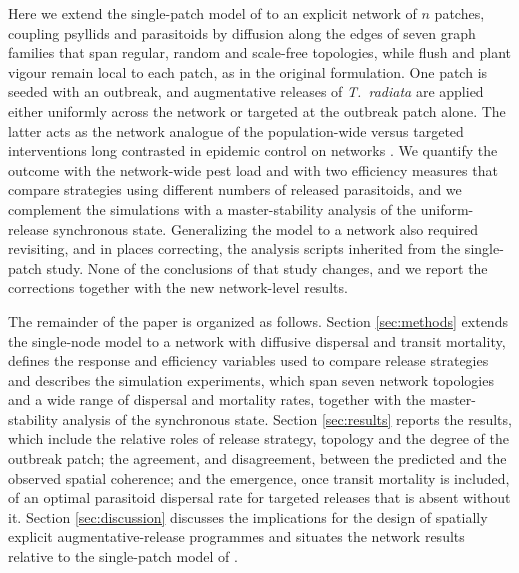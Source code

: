 Here we extend the single-patch model of \citet{RodriguezFalcon2026} to an explicit network of $n$ patches, coupling psyllids and parasitoids by diffusion along the edges of seven graph families that span regular, random and scale-free topologies, while flush and plant vigour remain local to each patch, as in the original formulation. One patch is seeded with an outbreak, and augmentative releases of \textit{T.\ radiata} are applied either uniformly across the network or targeted at the outbreak patch alone. The latter acts as the network analogue of the population-wide versus targeted interventions long contrasted in epidemic control on networks \citep{PastorSatorras2001,Colizza2007}. We quantify the outcome with the network-wide pest load and with two efficiency measures that compare strategies using different numbers of released parasitoids, and we complement the simulations with a master-stability analysis of the uniform-release synchronous state. Generalizing the model to a network also required revisiting, and in places correcting, the analysis scripts inherited from the single-patch study. None of the conclusions of that study changes, and we report the corrections together with the new network-level results.

The remainder of the paper is organized as follows. Section \ref{sec:methods} extends the single-node model to a network with diffusive dispersal and transit mortality, defines the response and efficiency variables used to compare release strategies and describes the simulation experiments, which span seven network topologies and a wide range of dispersal and mortality rates, together with the master-stability analysis of the synchronous state. Section \ref{sec:results} reports the results, which include the relative roles of release strategy, topology and the degree of the outbreak patch; the agreement, and disagreement, between the predicted and the observed spatial coherence; and the emergence, once transit mortality is included, of an optimal parasitoid dispersal rate for targeted releases that is absent without it. Section \ref{sec:discussion} discusses the implications for the design of spatially explicit augmentative-release programmes and situates the network results relative to the single-patch model of \citet{RodriguezFalcon2026}.

